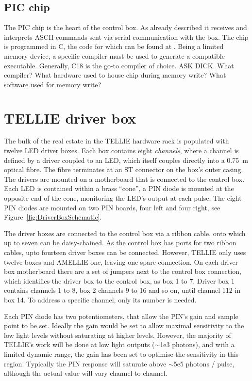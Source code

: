 \documentclass[12pt]{report}
\begin{document}
\section{PIC chip}
\label{sec:PICChip}
The PIC chip is the heart of the control box. As already described it receives and interprets ASCII commands sent via serial communication with the box. The chip is programmed in C, the code for which can be found at \cite{PIC code}. Being a limited memory device, a specific compiler must be used to generate a compatible executable. Generally, C18 is the go-to compiler of choice. ASK DICK. What compiler? What hardware used to house chip during memory write? What software used for memory write?

\chapter{TELLIE driver box}
\label{chap:DriverBox}
The bulk of the real estate in the TELLIE hardware rack is populated with twelve LED driver boxes. Each box contains eight \textit{channels}, where a channel is defined by a driver coupled to an LED, which itself couples directly into a 0.75~m optical fibre. The fibre terminates at an ST connector on the box's outer casing. The drivers are mounted on a motherboard that is connected to the control box. Each LED is contained within a brass ``cone'', a PIN diode is mounted at the opposite end of the cone, monitoring the LED's output at each pulse. The eight PIN diodes are mounted on two PIN boards, four left and four right, see Figure~\ref{fig:DriverBoxSchematic}.

The driver boxes are connected to the control box via a ribbon cable, onto which up to seven can be daisy-chained. As the control box has ports for two ribbon cables, upto fourteen driver boxes can be connected. However, TELLIE only uses twelve boxes and AMELLIE one, leaving one spare connection. On each driver box motherboard there are a set of jumpers next to the control box connection, which identifies the driver box to the control box, as box 1 to 7. Driver box 1 contains channels 1 to 8, box 2 channels 9 to 16 and so on, until channel 112 in box 14. To address a specific channel, only its number is needed.

Each PIN diode has two potentiometers, that allow the PIN's gain and sample point to be set. Ideally the gain would be set to allow maximal sensitivity to the low light levels without saturating at higher levels. However, the majority of TELLIE's work will be done at low light outputs ($\sim$1e3 photons), and with a limited dynamic range, the gain has been set to optimise the sensitivity in this region. Typically the PIN response will saturate above $\sim$5e5 photons / pulse, although the actual value will vary channel-to-channel. 
\end{document}
